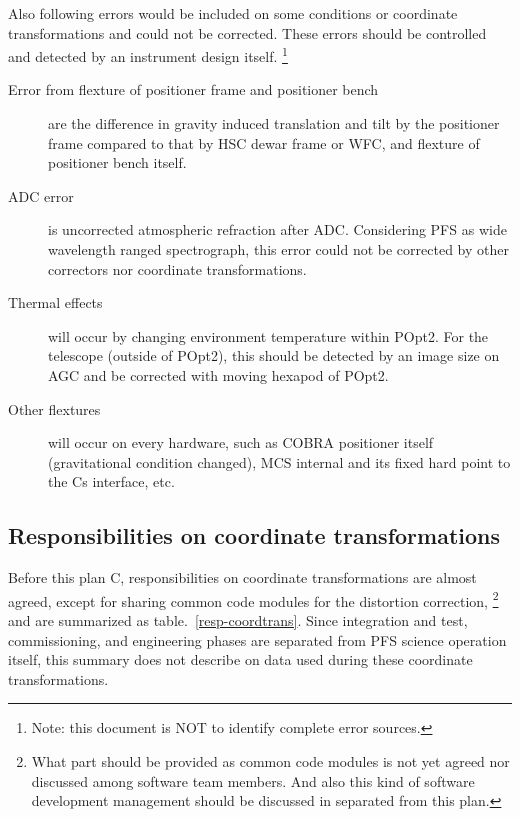 \documentclass[a4paper,notitlepage]{article}
\begin{document}
Also following errors would be included on some conditions or coordinate 
transformations and could not be corrected. 
These errors should be controlled and detected by an instrument design itself. 
\footnote{Note: this document is NOT to identify complete error sources.}

\begin{description}
  \item[Error from flexture of positioner frame and positioner bench] 
    are the difference in gravity induced translation and tilt by the 
    positioner frame compared to that by HSC dewar frame or WFC, and 
    flexture of positioner bench itself. 
  \item[ADC error]
    is uncorrected atmospheric refraction after ADC. 
    Considering PFS as wide wavelength ranged spectrograph, this error could 
    not be corrected by other correctors nor coordinate transformations. 
  \item[Thermal effects]
    will occur by changing environment temperature within POpt2. 
    For the telescope (outside of POpt2), this should be detected by an image 
    size on AGC and be corrected with moving hexapod of POpt2. 
  \item[Other flextures]
    will occur on every hardware, such as COBRA positioner itself 
    (gravitational condition changed), MCS internal and its fixed hard point 
    to the Cs interface, etc.
\end{description}

\subsection{Responsibilities on coordinate transformations}

Before this plan C, responsibilities on coordinate transformations are almost 
agreed, except for sharing common code modules for the distortion correction, 
\footnote{What part should be provided as common code modules is not yet 
agreed nor discussed among software team members. And also this kind of 
software development management should be discussed in separated from this 
plan.} 
and are summarized as table.~\ref{resp-coordtrans}. 
Since integration and test, commissioning, and engineering phases are 
separated from PFS science operation itself, this summary does not describe 
on data used during these coordinate transformations. 
\end{document}

